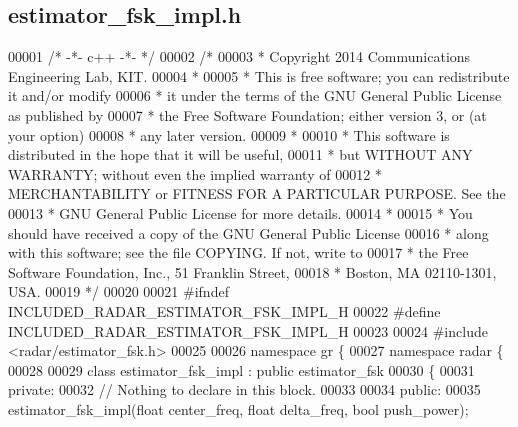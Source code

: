 \subsection{estimator\+\_\+fsk\+\_\+impl.\+h}
\label{estimator__fsk__impl_8h_source}

\begin{DoxyCode}
00001 \textcolor{comment}{/* -*- c++ -*- */}
00002 \textcolor{comment}{/* }
00003 \textcolor{comment}{ * Copyright 2014 Communications Engineering Lab, KIT.}
00004 \textcolor{comment}{ * }
00005 \textcolor{comment}{ * This is free software; you can redistribute it and/or modify}
00006 \textcolor{comment}{ * it under the terms of the GNU General Public License as published by}
00007 \textcolor{comment}{ * the Free Software Foundation; either version 3, or (at your option)}
00008 \textcolor{comment}{ * any later version.}
00009 \textcolor{comment}{ * }
00010 \textcolor{comment}{ * This software is distributed in the hope that it will be useful,}
00011 \textcolor{comment}{ * but WITHOUT ANY WARRANTY; without even the implied warranty of}
00012 \textcolor{comment}{ * MERCHANTABILITY or FITNESS FOR A PARTICULAR PURPOSE.  See the}
00013 \textcolor{comment}{ * GNU General Public License for more details.}
00014 \textcolor{comment}{ * }
00015 \textcolor{comment}{ * You should have received a copy of the GNU General Public License}
00016 \textcolor{comment}{ * along with this software; see the file COPYING.  If not, write to}
00017 \textcolor{comment}{ * the Free Software Foundation, Inc., 51 Franklin Street,}
00018 \textcolor{comment}{ * Boston, MA 02110-1301, USA.}
00019 \textcolor{comment}{ */}
00020  
00021 \textcolor{preprocessor}{#ifndef INCLUDED\_RADAR\_ESTIMATOR\_FSK\_IMPL\_H}
00022 \textcolor{preprocessor}{#define INCLUDED\_RADAR\_ESTIMATOR\_FSK\_IMPL\_H}
00023 
00024 \textcolor{preprocessor}{#include <radar/estimator_fsk.h>}
00025 
00026 \textcolor{keyword}{namespace }gr \{
00027   \textcolor{keyword}{namespace }radar \{
00028 
00029     \textcolor{keyword}{class }estimator_fsk_impl : \textcolor{keyword}{public} estimator_fsk
00030     \{
00031      \textcolor{keyword}{private}:
00032       \textcolor{comment}{// Nothing to declare in this block.}
00033 
00034      \textcolor{keyword}{public}:
00035       estimator_fsk_impl(\textcolor{keywordtype}{float} center_freq, \textcolor{keywordtype}{float} delta\_freq, \textcolor{keywordtype}{bool} push\_power);

\end{DoxyCode}
